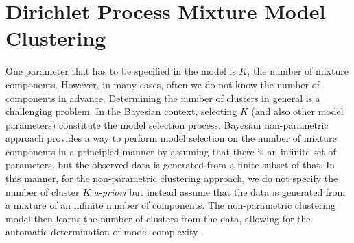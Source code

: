 \section{Dirichlet Process Mixture Model Clustering\label{background-dp-clustering}}

One parameter that has to be specified in the model is $K$, the number of mixture components. However, in many cases, often we do not know the number of components in advance. Determining the number of clusters in general is a challenging problem. In the Bayesian context, selecting $K$ (and also other model parameters) constitute the model selection process. Bayesian non-parametric approach provides a way to perform model selection on the number of mixture components in a principled manner by assuming that there is an infinite set of parameters, but the observed data is generated from a finite subset of that. In this manner, for the non-parametric clustering approach, we do not specify the number of cluster $K$ \emph{a-priori } but instead assume that the data is generated from a mixture of an infinite number of components. The non-parametric clustering model then learns the number of clusters from the data, allowing for the automatic determination of model complexity \cite{hjort2010bayesian}.

